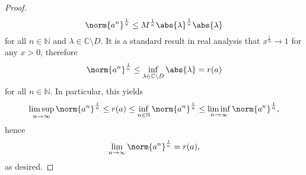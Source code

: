 \begin{proof}
    \begin{equation*}
        \norm{a^n}^{\frac1n} \leq M^{\frac1n} \abs{\lambda}^{\frac1n} \abs{\lambda}
    \end{equation*}
    for all \(n \in \mathbb{N}\) and \(\lambda \in \mathbb{C} \setminus D\). It is a standard result in real analysis that \(x^{\frac1n} \to 1\) for any \(x > 0\), therefore
    \begin{equation*}
        \norm{a^n}^{\frac1n} \leq \inf_{\lambda \in \mathbb{C} \setminus D}{\abs{\lambda}} = r(a)
    \end{equation*}
    for all \(n \in \mathbb{N}\). In particular, this yields
    \begin{equation*}
        \limsup_{n\to \infty}{\norm{a^n}^{\frac1n}} \leq r(a) \leq \inf_{n \in \mathbb{N}}{\norm{a^n}^{\frac1n}} \leq \liminf_{n\to\infty}{\norm{a^n}^{\frac1n}},
    \end{equation*}
    hence
    \begin{equation*}
        \lim_{n\to\infty}{\norm{a^n}^{\frac1n}} = r(a),
    \end{equation*}
    as desired.
\end{proof}


